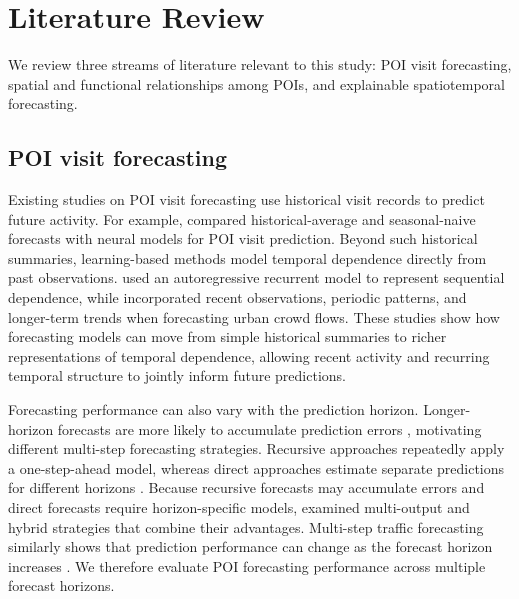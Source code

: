 \documentclass[preprint,authoryear,11pt]{elsarticle}
\def\citep#1{}%
\theoremstyle{definition}
\begin{document}
\section{Literature Review}
\label{lit}

We review three streams of literature relevant to this study: POI visit forecasting, spatial and functional relationships among POIs, and explainable spatiotemporal forecasting.

\subsection{POI visit forecasting}
\label{lit_poi}
Existing studies on POI visit forecasting use historical visit records to predict future activity.
For example, \citet{hajisafi2023learning} compared historical-average and seasonal-naive forecasts with neural models for POI visit prediction.
Beyond such historical summaries, learning-based methods model temporal dependence directly from past observations.
\citet{salinas2020deepar} used an autoregressive recurrent model to represent sequential dependence, while \citet{zhang2017deep} incorporated recent observations, periodic patterns, and longer-term trends when forecasting urban crowd flows.
These studies show how forecasting models can move from simple historical summaries to richer representations of temporal dependence, allowing recent activity and recurring temporal structure to jointly inform future predictions.

Forecasting performance can also vary with the prediction horizon.
Longer-horizon forecasts are more likely to accumulate prediction errors \citep{sorjamaa2007methodology,taieb2014boosting}, motivating different multi-step forecasting strategies.
Recursive approaches repeatedly apply a one-step-ahead model, whereas direct approaches estimate separate predictions for different horizons \citep{marcellino2006comparison,chevillon2007direct}.
Because recursive forecasts may accumulate errors and direct forecasts require horizon-specific models, \citet{taieb2012review} examined multi-output and hybrid strategies that combine their advantages.
Multi-step traffic forecasting similarly shows that prediction performance can change as the forecast horizon increases \citep{wang2020forecast}.
We therefore evaluate POI forecasting performance across multiple forecast horizons.
\end{document}
